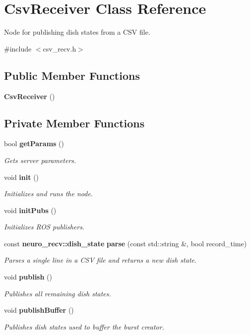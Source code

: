 \section{\-Csv\-Receiver \-Class \-Reference}
\label{classCsvReceiver}


\-Node for publishing dish states from a \-C\-S\-V file.  




{\ttfamily \#include $<$csv\-\_\-recv.\-h$>$}

\subsection*{\-Public \-Member \-Functions}
\begin{DoxyCompactItemize}
\item 
{\bf \-Csv\-Receiver} ()
\end{DoxyCompactItemize}
\subsection*{\-Private \-Member \-Functions}
\begin{DoxyCompactItemize}
\item 
bool {\bf get\-Params} ()
\begin{DoxyCompactList}\small\item\em \-Gets server parameters. \end{DoxyCompactList}\item 
void {\bf init} ()
\begin{DoxyCompactList}\small\item\em \-Initializes and runs the node. \end{DoxyCompactList}\item 
void {\bf init\-Pubs} ()
\begin{DoxyCompactList}\small\item\em \-Initializes \-R\-O\-S publishers. \end{DoxyCompactList}\item 
const {\bf neuro\-\_\-recv\-::dish\-\_\-state} {\bf parse} (const std\-::string \&, bool record\-\_\-time)
\begin{DoxyCompactList}\small\item\em \-Parses a single line in a \-C\-S\-V file and returns a new dish state. \end{DoxyCompactList}\item 
void {\bf publish} ()
\begin{DoxyCompactList}\small\item\em \-Publishes all remaining dish states. \end{DoxyCompactList}\item 
void {\bf publish\-Buffer} ()
\begin{DoxyCompactList}\small\item\em \-Publishes dish states used to buffer the burst creator. \end{DoxyCompactList}\end{DoxyCompactItemize}
